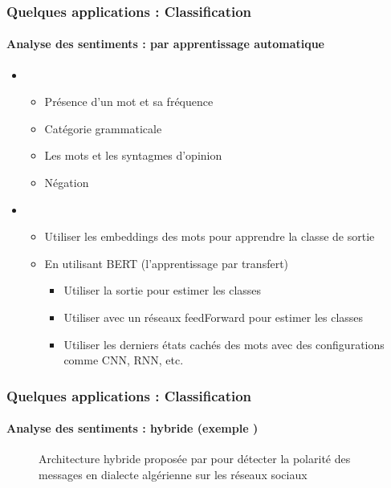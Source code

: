 \documentclass[xcolor=table]{beamer}
\begin{document}
\begin{frame}
	\frametitle{Quelques applications : Classification}
	\framesubtitle{Analyse des sentiments : par apprentissage automatique}
	
	\begin{itemize}
		\item {}
		\begin{itemize}
			\item Présence d'un mot et sa fréquence 
			\item Catégorie grammaticale
			\item Les mots et les syntagmes d'opinion
			\item Négation
		\end{itemize}
		\item {}
		\begin{itemize}
			\item Utiliser les embeddings des mots pour apprendre la classe de sortie
			\item En utilisant BERT (l'apprentissage par transfert)
			\begin{itemize}
				\item Utiliser la sortie \keyword{[CLS]} pour estimer les classes
				\item Utiliser \keyword{[CLS]} avec un réseaux feedForward pour estimer les classes
				\item Utiliser les derniers états cachés des mots avec des configurations comme CNN, RNN, etc.
			\end{itemize}
		\end{itemize}
	\end{itemize}

\end{frame}

\begin{frame}
	\frametitle{Quelques applications : Classification}
	\framesubtitle{Analyse des sentiments : hybride (exemple \cite{18-bettiche-al}) }
	
	\begin{figure}
		\centering
		\caption{Architecture hybride proposée par \cite{18-bettiche-al} pour détecter la polarité des messages en dialecte algérienne sur les réseaux sociaux}
	\end{figure}
	
\end{frame}
\end{document}
